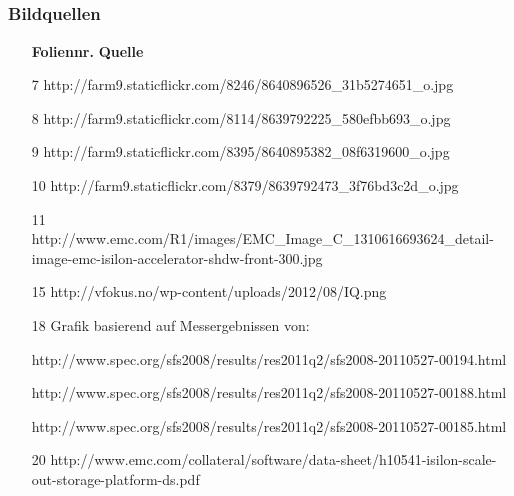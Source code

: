 \documentclass{beamer}
\begin{document}
\subsection{}
\begin{frame}[fragile]
  \frametitle{Bildquellen}

  \tiny
  \begin{itemize}
    \item[\textbf{Foliennr.}] \textbf{Quelle}
    
    \item[7] http://farm9.staticflickr.com/8246/8640896526\_31b5274651\_o.jpg
    \item[8] http://farm9.staticflickr.com/8114/8639792225\_580efbb693\_o.jpg
    \item[9] http://farm9.staticflickr.com/8395/8640895382\_08f6319600\_o.jpg
    \item[10] http://farm9.staticflickr.com/8379/8639792473\_3f76bd3c2d\_o.jpg 
    \item[11] http://www.emc.com/R1/images/EMC\_Image\_C\_1310616693624\_detail-image-emc-isilon-accelerator-shdw-front-300.jpg
    \item[15] http://vfokus.no/wp-content/uploads/2012/08/IQ.png
    \item[18] Grafik basierend auf Messergebnissen von:
    \item[] http://www.spec.org/sfs2008/results/res2011q2/sfs2008-20110527-00194.html
    \item[] http://www.spec.org/sfs2008/results/res2011q2/sfs2008-20110527-00188.html
    \item[] http://www.spec.org/sfs2008/results/res2011q2/sfs2008-20110527-00185.html
    \item[20] http://www.emc.com/collateral/software/data-sheet/h10541-isilon-scale-out-storage-platform-ds.pdf 
  \end{itemize}
  
\end{frame}
\end{document}

